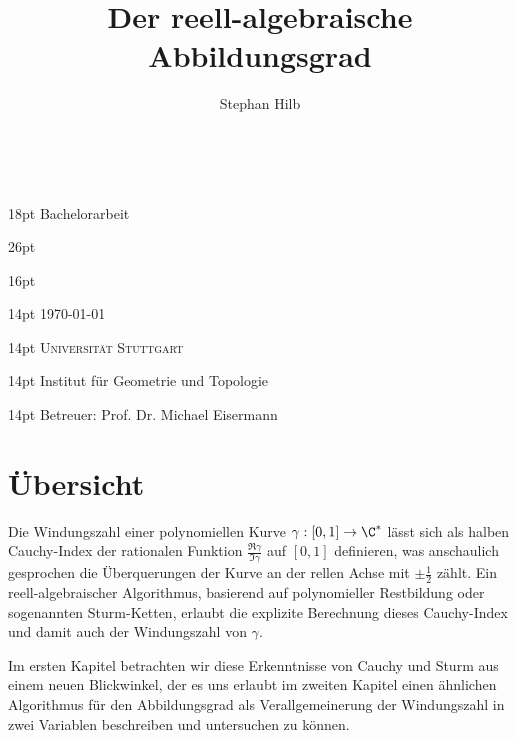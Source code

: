 \documentclass{mythesis}
\title{Der reell-algebraische Abbildungsgrad}
\author{Stephan Hilb}
\begin{document}
\begin{titlepage}
    \begin{center}
        ~\par\vspace{6em}
        {
            \fontsize { 18pt } { 18pt } \selectfont
            Bachelorarbeit
        }
        \par\vspace{4em}
        {
            \fontsize { 26pt } { 26pt } \selectfont \sffamily \bfseries
            \thetitle
        }
        \par\vspace{4em}
        {
            \fontsize { 16pt } { 16pt } \selectfont \scshape
            \theauthor
        }
        \par\vspace{1.5em}
        {
            \fontsize { 14pt } { 14pt } \selectfont %
            \today
        }
        \par\vspace{18em}
        {
            \fontsize { 14pt } { 14pt } \selectfont \scshape
            Universität Stuttgart
        }
        \par\vspace{1em}
        {
            \fontsize { 14pt } { 14pt } \selectfont %
            Institut für Geometrie und Topologie
        }
        \par\vspace{1em}
        {
            \fontsize { 14pt } { 14pt } \selectfont %
            Betreuer: Prof. Dr. Michael Eisermann
        }
    \end{center}
\end{titlepage}

\chapter*{Übersicht}

Die Windungszahl einer polynomiellen Kurve $\gamma: [0, 1] \to \C^*$ lässt sich als halben Cauchy-Index der rationalen Funktion $\frac{\Re \gamma}{\Im \gamma}$ auf $[0,1]$ definieren, was anschaulich gesprochen die Überquerungen der Kurve an der rellen Achse mit $\pm \frac{1}{2}$ zählt.
Ein reell-algebraischer Algorithmus, basierend auf polynomieller Restbildung oder sogenannten Sturm-Ketten, erlaubt die explizite Berechnung dieses Cauchy-Index und damit auch der Windungszahl von $\gamma$.

Im ersten Kapitel betrachten wir diese Erkenntnisse von Cauchy und Sturm aus einem neuen Blickwinkel, der es uns erlaubt im zweiten Kapitel einen ähnlichen Algorithmus für den Abbildungsgrad als Verallgemeinerung der Windungszahl in zwei Variablen beschreiben und untersuchen zu können.
\end{document}
